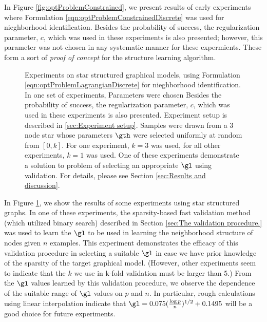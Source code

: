 \documentclass{article}
\begin{document}
In Figure \ref{fig:optProblemConstrained}, we present results of early experiments where Formulation \ref{eqn:optProblemConstrainedDiscrete} was used for nieghborhood identification. Besides the probability of success, the regularization parameter, $c$, which was used in these experiments is also presented; however, this parameter was not chosen in any systematic manner for these expermients. These form a sort of \textit{proof of concept} for the structure learning algorithm.

\begin{figure}[h]
  \begin{center}
    
  \end{center}
  \caption{Experiments on star structured graphical models, using Formulation \ref{eqn:optProblemLagrangianDiscrete} for nieghborhood identification. In one set of experiments, Parameters were chosen Besides the probability of success, the regularization parameter, $c$, which was used in these experiments is also presented. Experiment setup is described in \ref{sec:Experiment setup}. Samples were drawn from a 3 node star whose parameters $\gth$ were selected uniformly at random from $[0, k]$. For one experiment, $k=3$ was used, for all other experiments, $k=1$ was used. One of these experiments demonstrate a solution to problem of selecting an appropriate $\gl$ using validation. For details, please see Section \ref{sec:Results and discussion}.}
  \label{fig:optProblemLagrangian}
\end{figure}

In Figure \ref{fig:optProblemLagrangian}, we show the results of some experiments using star structured graphs. In one of these experiments, the sparsity-based fast validation method (which utilized binary search) described in Section \ref{sec:The validation procedure.} was used to learn the $\gl$ to be used in learning the neighborhood structure of nodes given $n$ examples. This experiment demonstrates the efficacy of this validation procedure in selecting a suitable $\gl$ in case we have prior knowledge of the sparsity of the target graphical model. (However, other experiments seem to indicate that the $k$ we use in k-fold validation must be larger than 5.) From the $\gl$ values learned by this validation procedure, we observe the dependence of the suitable range of $\gl$ values on $p$ and $n$. In particular, rough calculations using linear interpolation indicate that $\gl = 0.075 (\frac{\log p}{n})^{1/2} + 0.1495$ will be a good choice for future experiments.
\end{document}
